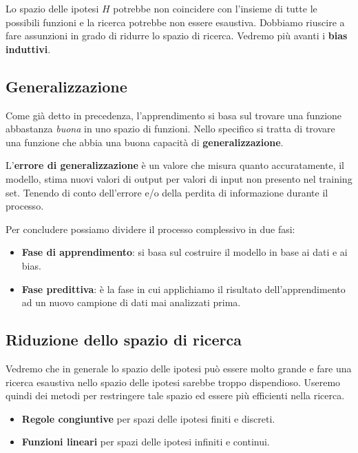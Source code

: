 Lo spazio delle ipotesi $H$ potrebbe non coincidere con l'insieme di tutte le possibili funzioni e la ricerca potrebbe
non essere esaustiva. Dobbiamo riuscire a fare assunzioni in grado di ridurre lo spazio di ricerca. Vedremo pi\`u avanti
i \textbf{bias induttivi}.

\subsection{Generalizzazione}
Come gi\`a detto in precedenza, l'apprendimento si basa sul trovare una funzione abbastanza \emph{buona} in uno spazio di
funzioni. Nello specifico si tratta di trovare una funzione che abbia una buona capacit\`a di \textbf{generalizzazione}.

L'\textbf{errore di generalizzazione} \`e un valore che misura quanto accuratamente, il modello, stima nuovi valori di
output per valori di input non presento nel training set. Tenendo di conto dell'errore e/o della perdita di informazione
durante il processo.

Per concludere possiamo dividere il processo complessivo in due fasi:
\begin{itemize}
	\item \textbf{Fase di apprendimento}: si basa sul costruire il modello in base ai dati e ai bias.
	\item \textbf{Fase predittiva}: \`e la fase in cui applichiamo il risultato dell'apprendimento ad un nuovo campione di
	      dati mai analizzati prima.
\end{itemize}

\subsection{Riduzione dello spazio di ricerca}
Vedremo che in generale lo spazio delle ipotesi pu\`o essere molto grande e fare una ricerca esaustiva nello spazio delle
ipotesi sarebbe troppo dispendioso. Useremo quindi dei metodi per restringere tale spazio ed essere pi\`u efficienti nella
ricerca.
\begin{itemize}
	\item \textbf{Regole congiuntive} per spazi delle ipotesi finiti e discreti.
	\item \textbf{Funzioni lineari} per spazi delle ipotesi infiniti e continui.
\end{itemize}